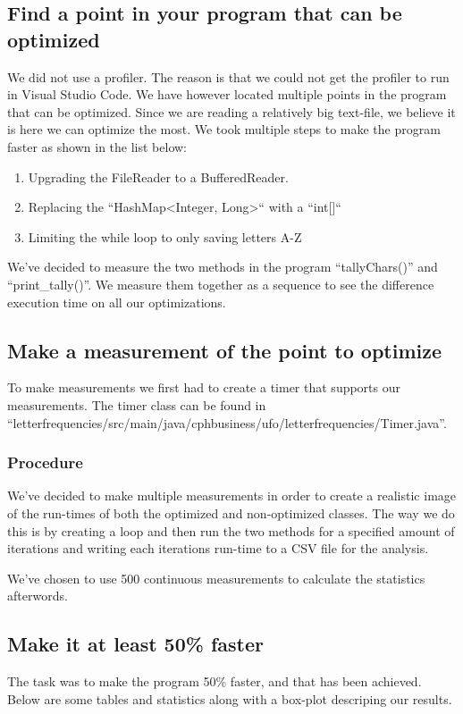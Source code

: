 \documentclass{article}
\begin{document}
\subsection{Find a point in your program that can be optimized}
We did not use a profiler. The reason is that we could not get 
the profiler to run in Visual Studio Code. We have however located 
multiple points in the program that can be optimized. Since we are 
reading a relatively big text-file, we believe it is here we can 
optimize the most. We took multiple steps to make the program faster
as shown in the list below:
\begin{enumerate}
    \item Upgrading the FileReader to a BufferedReader.
    \item Replacing the ``HashMap\textless Integer, Long\textgreater`` with a ``int[]``
    \item Limiting the while loop to only saving letters A-Z
\end{enumerate}
We've decided to measure the two methods in the program ``tallyChars()'' and ``print\_tally()''. 
We measure them together as a sequence to see the difference execution time on all our optimizations.  

\subsection{Make a measurement of the point to optimize}
To make measurements we first had to create a timer that supports our 
measurements. The timer class can be found in 
``letterfrequencies/src/main/java/cphbusiness/ufo/letterfrequencies/Timer.java''.

\subsubsection*{Procedure}
We've decided to make multiple measurements in order to create a realistic image 
of the run-times of both the optimized and non-optimized classes. The way we do this
is by creating a loop and then run the two methods for a specified amount of iterations
and writing each iterations run-time to a CSV file for the analysis. 

We've chosen to use 500 continuous measurements to calculate the statistics afterwords.


\subsection{Make it at least 50\% faster}
The task was to make the program 50\% faster, and that has been achieved. 
Below are some tables and statistics along with a box-plot descriping our results.
\end{document}
